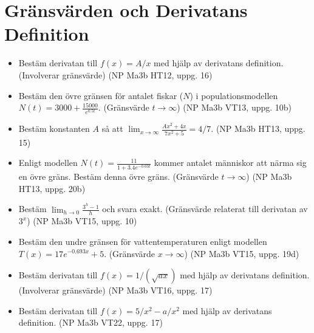 \documentclass{article}
\begin{document}
\section{Gränsvärden och Derivatans Definition}
\begin{itemize}
    \item Bestäm derivatan till $f(x) = A/x$ med hjälp av derivatans definition. (Involverar gränsvärde) (NP Ma3b HT12, uppg. 16)
    \item Bestäm den övre gränsen för antalet fiskar ($N$) i populationsmodellen $N(t) = 3000 + \frac{15000}{e^{0.5t}}$. (Gränsvärde $t \to \infty$) (NP Ma3b VT13, uppg. 10b)
    \item Bestäm konstanten $A$ så att $\lim_{x \to \infty} \frac{A x^2 + 4 x}{7 x^2 + 5} = 4/7$. (NP Ma3b HT13, uppg. 15)
    \item Enligt modellen $N(t) = \frac{11}{1+3.4e^{-0.03t}}$ kommer antalet människor att närma sig en övre gräns. Bestäm denna övre gräns. (Gränsvärde $t \to \infty$) (NP Ma3b HT13, uppg. 20b)
    \item Bestäm $\lim_{h \to 0} \frac{3^h - 1}{h}$ och svara exakt. (Gränsvärde relaterat till derivatan av $3^x$) (NP Ma3b VT15, uppg. 10)
    \item Bestäm den undre gränsen för vattentemperaturen enligt modellen $T(x) = 17e^{-0.693x} + 5$. (Gränsvärde $x \to \infty$) (NP Ma3b VT15, uppg. 19d)
    \item Bestäm derivatan till $f(x) = 1/(\sqrt{ax})$ med hjälp av derivatans definition. (Involverar gränsvärde) (NP Ma3b VT16, uppg. 17)
    \item Bestäm derivatan till $f(x) = 5/x^2 - a/x^2$ med hjälp av derivatans definition. (NP Ma3b VT22, uppg. 17)
\end{itemize}
\end{document}
